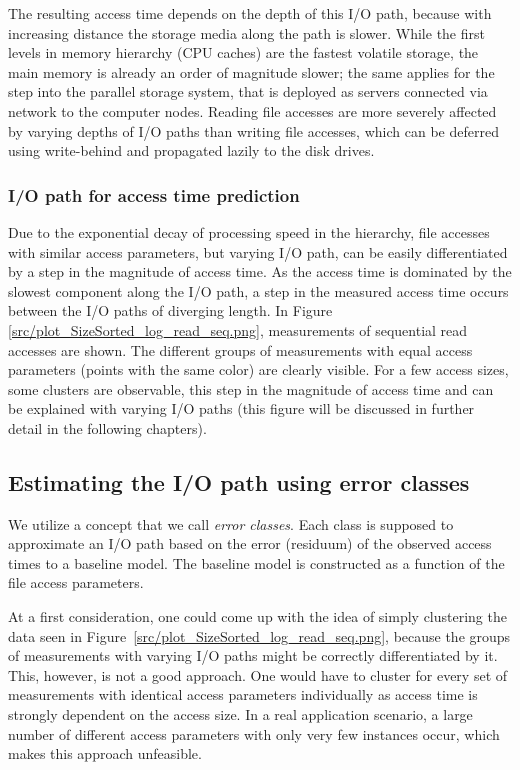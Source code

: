 \documentclass{superfri}
\begin{document}
	The resulting access time depends on the depth of this I/O path, because with increasing distance the storage media along the path is slower.
	While the first levels in memory hierarchy (CPU caches) are the fastest volatile storage, the main memory is already an order of magnitude slower; the same applies for the step into the parallel storage system, that is deployed as servers connected via network to the computer nodes.
	Reading file accesses are more severely affected by varying depths of I/O paths than writing file accesses, which can be deferred using write-behind and propagated lazily to the disk drives.
	
	\subsubsection{I/O path for access time prediction}
	\label{sec:path_for_pred}
	Due to the exponential decay of processing speed in the hierarchy, file accesses with similar access parameters, but varying I/O path, can be easily differentiated by a step in the magnitude of access time.
	As the access time is dominated by the slowest component along the I/O path, a step in the measured access time occurs between the  I/O paths of diverging length.
	In Figure\,\ref{src/plot_SizeSorted_log_read_seq.png}, measurements of sequential read accesses are shown.
	The different groups of measurements with equal access parameters (points with the same color) are clearly visible.
	For a few access sizes, some clusters are observable, this step in the magnitude of access time and can be explained with varying I/O paths (this figure will be discussed in further detail in the following chapters).
	
	\subsection{Estimating the I/O path using error classes}
	\label{sec:error_classes}
	We utilize a concept that we call \textit{error classes}.
	Each class is supposed to approximate an I/O path based on the error (residuum) of the observed access times to a baseline model.
	The baseline model is constructed as a function of the file access parameters.
	
	At a first consideration, one could come up with the idea of simply clustering the data seen in Figure~\ref{src/plot_SizeSorted_log_read_seq.png}, because the groups of measurements with varying I/O paths might be correctly differentiated by it. 
	This, however, is not a good approach. One would have to cluster for every set of measurements with identical access parameters individually as access time is strongly dependent on the access size. 
	In a real application scenario, a large number of different access parameters with only very few instances occur, which makes this approach unfeasible.
	
\end{document}

